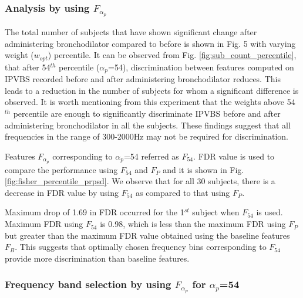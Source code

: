 \documentclass{article}
\begin{document}
%
\subsubsection{Analysis by using $F_{\alpha_{p}}$}
The total number of subjects that have shown significant change after administering bronchodilator compared to before is shown in Fig. 5 with varying weight ($w_{opt}$) percentile. It can be observed from Fig. \ref{fig:sub_count_percentile}, that after 54$^{th}$ percentile ($\alpha_p$=54), discrimination between features computed on IPVBS recorded before and after administering bronchodilator reduces. This leads to a reduction in the number of subjects for whom a significant difference is observed. It is worth mentioning from this experiment that the weights above 54$^{th}$ percentile are enough to significantly discriminate IPVBS before and after administering bronchodilator in all the subjects. These findings suggest that all frequencies in the range of 300-2000Hz may not be required for discrimination.

Features $F_{\alpha_p}$ corresponding to $\alpha_p$=54 referred as $F_{54}$.
FDR value is used to compare the performance using $F_{54}$ and $F_P$ and it is shown in Fig. \ref{fig:fisher_percentile_prpsd}. We observe that for all 30 subjects, there is a decrease in FDR value by using $F_{54}$ as compared to that using $F_{P}$. 


Maximum drop of 1.69 in FDR occurred for the 1$^{st}$ subject when $F_{54}$ is used. Maximum FDR using $F_{54}$ is 0.98, which is less than the maximum FDR using $F_P$ but greater than the maximum FDR value obtained using the baseline features $F_{B}$. This suggests that optimally chosen frequency bins corresponding to $F_{54}$ provide more discrimination than baseline features.

\subsubsection{Frequency band selection by using $F_{\alpha_{p}}$ for $\alpha_{p}$=54}
\end{document}
